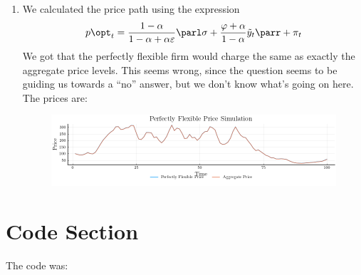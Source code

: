 \documentclass[10pt]{article}
\begin{document}
\begin{enumerate}
	\item We calculated the price path using the expression \[p\opt_t = \frac{1-\alpha}{1-\alpha + \alpha\varepsilon} \parl \sigma + \frac{\varphi + \alpha}{1-\alpha} \tilde{y}_t\parr + \pi_t\]We got that the perfectly flexible firm would charge the same as exactly the aggregate price levels. This seems wrong, since the question seems to be guiding us towards a ``no'' answer, but we don't know what's going on here. The prices are:\begin{figure}[H] \centering \includegraphics[width=15cm]{macro_hw7_code/5_perfectly_flexible_price_simulation.png}\end{figure}
\end{enumerate}


\newpage
\section*{Code Section}\label{sec:code}

The code was:


\end{document}
